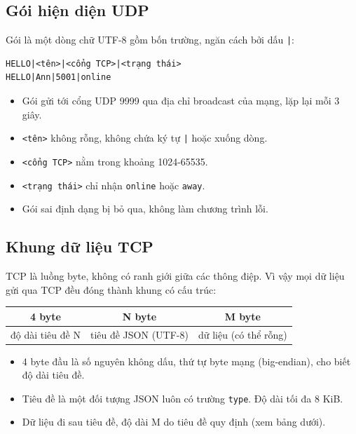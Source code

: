 \documentclass[a4paper,12pt]{article}
\newcommand{\code}[1]{\texttt{#1}}
\begin{document}
\subsection{Gói hiện diện UDP}
Gói là một dòng chữ UTF-8 gồm bốn trường, ngăn cách bởi dấu \code{|}:
\begin{verbatim}
HELLO|<tên>|<cổng TCP>|<trạng thái>
HELLO|Ann|5001|online
\end{verbatim}
\begin{itemize}
\item Gói gửi tới cổng UDP 9999 qua địa chỉ broadcast của mạng, lặp lại mỗi 3 giây.
\item \code{<tên>} không rỗng, không chứa ký tự \code{|} hoặc xuống dòng.
\item \code{<cổng TCP>} nằm trong khoảng 1024-65535.
\item \code{<trạng thái>} chỉ nhận \code{online} hoặc \code{away}.
\item Gói sai định dạng bị bỏ qua, không làm chương trình lỗi.
\end{itemize}

\subsection{Khung dữ liệu TCP}
TCP là luồng byte, không có ranh giới giữa các thông điệp. Vì vậy mọi dữ liệu gửi qua TCP đều đóng thành khung có cấu trúc:

\begin{center}
\begin{tabular}{|c|c|c|}
\hline
\textbf{4 byte} & \textbf{N byte} & \textbf{M byte} \\ \hline
độ dài tiêu đề N & tiêu đề JSON (UTF-8) & dữ liệu (có thể rỗng) \\ \hline
\end{tabular}
\end{center}
\begin{itemize}
\item 4 byte đầu là số nguyên không dấu, thứ tự byte mạng (big-endian), cho biết độ dài tiêu đề.
\item Tiêu đề là một đối tượng JSON luôn có trường \code{type}. Độ dài tối đa 8 KiB.
\item Dữ liệu đi sau tiêu đề, độ dài M do tiêu đề quy định (xem bảng dưới).
\end{itemize}
\end{document}
